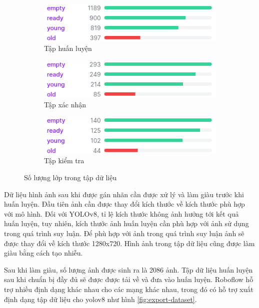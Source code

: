 \begin{figure}[H]
	\centering
	\begin{subfigure}{0.8\textwidth}
		\includegraphics{images/dataset-train}
		\caption{Tập huấn luyện}
	\end{subfigure}
	\begin{subfigure}{0.8\textwidth}
		\includegraphics{images/dataset-val}
		\caption{Tập xác nhận}
	\end{subfigure}
	\begin{subfigure}{0.8\textwidth}
		\includegraphics{images/dataset-test}
		\caption{Tập kiểm tra}
	\end{subfigure}
	\caption{Số lượng lớp trong tập dữ liệu}
	\label{fig:dataset}
\end{figure}

Dữ liệu hình ảnh sau khi được gán nhãn cần được xử lý và làm giàu trước khi huấn luyện. Đầu tiên ảnh cần được thay đổi kích thước về kích thước phù hợp với mô hình. Đối với YOLOv8, tỉ lệ kích thước không ảnh hưởng tới kết quả huấn luyện, tuy nhiên, kích thước ảnh huấn luyện cần phù hợp với ảnh sử dụng trong quá trình suy luận. Để phù hợp với ảnh trong quá trình suy luận ảnh sẽ được thay đổi về kích thước 1280x720. Hình ảnh trong tập dữ liệu cũng được làm giàu bằng cách tạo nhiễu.

Sau khi làm giàu, số lượng ảnh được sinh ra là 2086 ảnh. Tập dữ liệu huấn luyện sau khi chuẩn bị đầy đủ sẽ được được tải về và đưa vào huấn luyện. Roboflow hỗ trợ nhiều định dạng khác nhau cho các mạng khác nhau, trong đó có hỗ trợ xuất định dạng tập dữ liệu cho \acrshort{yolo}v8 như hình \ref{fig:export-dataset}.

